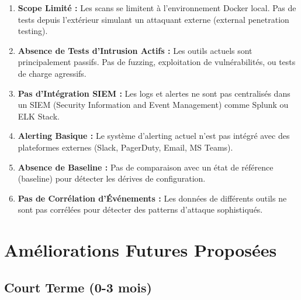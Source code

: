\documentclass[11pt,a4paper]{report}
\begin{document}
\begin{enumerate}
    \item \textbf{Scope Limité :} Les scans se limitent à l'environnement Docker local. Pas de tests depuis l'extérieur simulant un attaquant externe (external penetration testing).
    
    \item \textbf{Absence de Tests d'Intrusion Actifs :} Les outils actuels sont principalement passifs. Pas de fuzzing, exploitation de vulnérabilités, ou tests de charge agressifs.
    
    \item \textbf{Pas d'Intégration SIEM :} Les logs et alertes ne sont pas centralisés dans un SIEM (Security Information and Event Management) comme Splunk ou ELK Stack.
    
    \item \textbf{Alerting Basique :} Le système d'alerting actuel n'est pas intégré avec des plateformes externes (Slack, PagerDuty, Email, MS Teams).
    
    \item \textbf{Absence de Baseline :} Pas de comparaison avec un état de référence (baseline) pour détecter les dérives de configuration.
    
    \item \textbf{Pas de Corrélation d'Événements :} Les données de différents outils ne sont pas corrélées pour détecter des patterns d'attaque sophistiqués.
\end{enumerate}

\section{Améliorations Futures Proposées}

\subsection{Court Terme (0-3 mois)}
\end{document}
